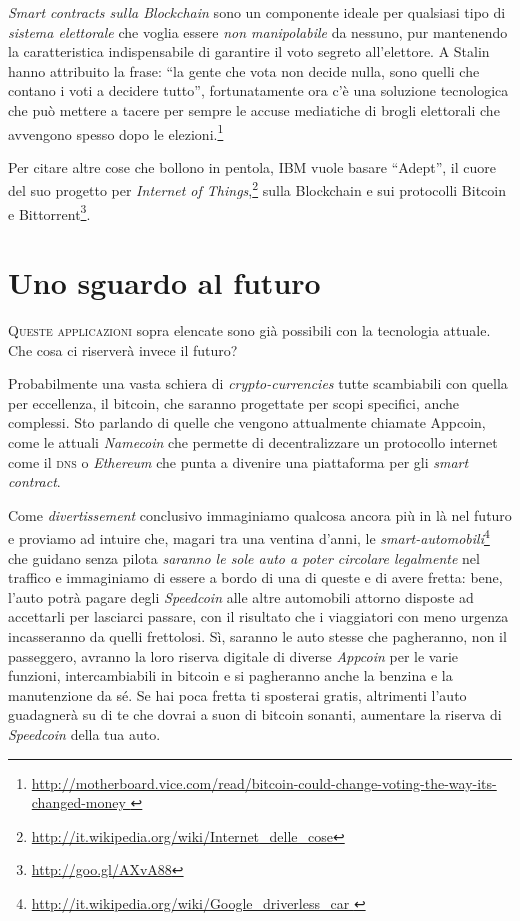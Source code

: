 \documentclass[a4paper,12pt,italian]{article}
\newcommand{\longurl}[1]{%
\href{#1}{\ttfamily \smaller #1}%
}%
\begin{document}
\bigskip

\emph{Smart contracts sulla Blockchain} sono un componente
ideale per qualsiasi tipo di \emph{sistema
elettorale} che voglia essere \emph{non manipolabile} da nessuno, pur
mantenendo la caratteristica indispensabile di garantire il voto
segreto all’elettore. A Stalin hanno attribuito la frase: “la gente che
vota non decide nulla, sono quelli che contano i voti a decidere
tutto”, fortunatamente ora c’è una soluzione tecnologica che può
mettere a tacere per sempre le accuse mediatiche di brogli elettorali
che avvengono spesso dopo le
elezioni.\footnote{\longurl{http://motherboard.vice.com/read/bitcoin-could-change-voting-the-way-its-changed-money
}}


\bigskip

Per citare altre cose che bollono in pentola, IBM vuole basare “Adept”,
il cuore del suo progetto per \emph{Internet of Things},\footnote{\url{http://it.wikipedia.org/wiki/Internet_delle_cose}}
sulla Blockchain e
sui protocolli Bitcoin e Bittorrent\footnote{\url{http://goo.gl/AXvA88}}.


\section*{Uno sguardo al futuro}

\lettrine[lines=2]{Q}{ueste applicazioni} sopra elencate sono già possibili con la tecnologia attuale. Che cosa ci
riserverà invece il futuro?

\bigskip

Probabilmente una vasta schiera di \emph{crypto-currencies} tutte scambiabili con
quella per eccellenza, il bitcoin, che saranno progettate per scopi
specifici, anche complessi. Sto parlando di quelle che vengono
attualmente chiamate Appcoin, come le attuali \emph{Namecoin} che permette di
decentralizzare un protocollo internet come il \textsc{dns} o \emph{Ethereum} che punta
a divenire una piattaforma per gli \emph{smart contract}.

\bigskip

Come \emph{divertissement} conclusivo immaginiamo qualcosa ancora più in là nel
futuro e proviamo ad intuire che, magari tra una ventina d’anni, le
\emph{smart-automobili}\footnote{\url{http://it.wikipedia.org/wiki/Google\_driverless\_car
}} che guidano senza pilota \emph{saranno le sole auto a poter circolare
legalmente} nel traffico e immaginiamo di essere a bordo di una di
queste e di avere fretta: bene, l’auto potrà pagare degli \emph{Speedcoin}
alle altre automobili attorno disposte ad accettarli per lasciarci
passare, con il risultato che i viaggiatori con meno urgenza
incasseranno da quelli frettolosi. Sì, saranno le auto stesse che
pagheranno, non il passeggero, avranno la loro riserva digitale di
diverse \emph{Appcoin} per le varie funzioni, intercambiabili in bitcoin e si
pagheranno anche la benzina e la manutenzione da sé. Se hai poca fretta
ti sposterai gratis, altrimenti l’auto guadagnerà su di te che dovrai a
suon di bitcoin sonanti, aumentare la riserva di \emph{Speedcoin} della tua
auto.
\end{document}
